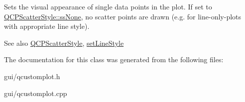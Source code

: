 Sets the visual appearance of single data points in the plot. If set to \hyperlink{classQCPScatterStyle_adb31525af6b680e6f1b7472e43859349abd144c291ca274f77053ec68cab6c022}{Q\+C\+P\+Scatter\+Style\+::ss\+None}, no scatter points are drawn (e.\+g. for line-\/only-\/plots with appropriate line style).

\begin{DoxySeeAlso}{See also}
\hyperlink{classQCPScatterStyle}{Q\+C\+P\+Scatter\+Style}, \hyperlink{classQCPGraph_a513fecccff5b2a50ce53f665338c60ff}{set\+Line\+Style} 
\end{DoxySeeAlso}


The documentation for this class was generated from the following files\+:\begin{DoxyCompactItemize}
\item 
gui/qcustomplot.\+h\item 
gui/qcustomplot.\+cpp\end{DoxyCompactItemize}
